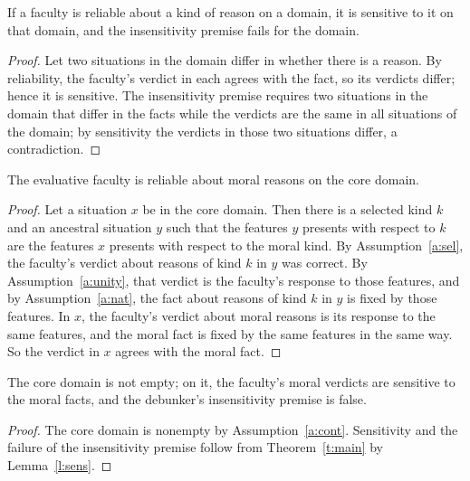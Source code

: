 \documentclass{situationist-preprint}
\begin{document}
\begin{lemma}\label{l:sens}
If a faculty is reliable about a kind of reason on a domain, it is sensitive to it on that domain, and the insensitivity premise fails for the domain.
\end{lemma}

\begin{proof}
Let two situations in the domain differ in whether there is a reason. By reliability, the faculty's verdict in each agrees with the fact, so its verdicts differ; hence it is sensitive. The insensitivity premise requires two situations in the domain that differ in the facts while the verdicts are the same in all situations of the domain; by sensitivity the verdicts in those two situations differ, a contradiction.
\end{proof}

\begin{theorem}[Tracking]\label{t:main}
The evaluative faculty is reliable about moral reasons on the core domain.
\end{theorem}

\begin{proof}
Let a situation $x$ be in the core domain. Then there is a selected kind $k$ and an ancestral situation $y$ such that the features $y$ presents with respect to $k$ are the features $x$ presents with respect to the moral kind. By Assumption~\ref{a:sel}, the faculty's verdict about reasons of kind $k$ in $y$ was correct. By Assumption~\ref{a:unity}, that verdict is the faculty's response to those features, and by Assumption~\ref{a:nat}, the fact about reasons of kind $k$ in $y$ is fixed by those features. In $x$, the faculty's verdict about moral reasons is its response to the same features, and the moral fact is fixed by the same features in the same way. So the verdict in $x$ agrees with the moral fact.
\end{proof}

\begin{corollary}\label{c:main}
The core domain is not empty; on it, the faculty's moral verdicts are sensitive to the moral facts, and the debunker's insensitivity premise is false.
\end{corollary}

\begin{proof}
The core domain is nonempty by Assumption~\ref{a:cont}. Sensitivity and the failure of the insensitivity premise follow from Theorem~\ref{t:main} by Lemma~\ref{l:sens}.
\end{proof}
\end{document}
